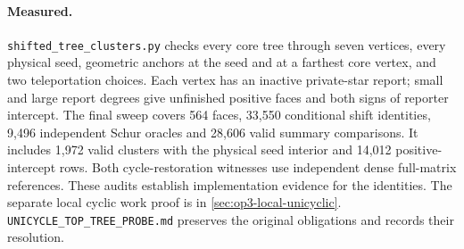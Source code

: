 \paragraph{Measured.}
\texttt{shifted\_tree\_clusters.py} checks every core tree through seven
vertices, every physical seed, geometric anchors at the seed and at a
farthest core vertex, and two teleportation choices. Each vertex has an
inactive private-star report; small and large report degrees give unfinished
positive faces and both signs of reporter intercept. The final sweep covers
564 faces, 33,550 conditional shift identities, 9,496 independent Schur
oracles and 28,606 valid summary comparisons. It includes 1,972 valid clusters
with the physical seed interior and 14,012 positive-intercept rows. Both
cycle-restoration witnesses use independent dense full-matrix references.
These audits establish implementation evidence for the identities. The
separate local cyclic work proof is in \cref{sec:op3-local-unicyclic}.
\texttt{UNICYCLE\_TOP\_TREE\_PROBE.md} preserves the original obligations
and records their resolution.
